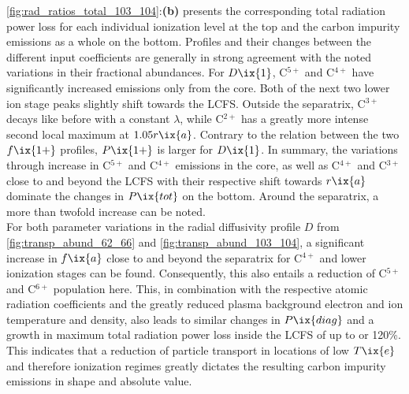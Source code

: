                 \cref{fig:rad_ratios_total_103_104}:\textbf{(b)} presents the corresponding total radiation power loss for each individual ionization level at the top and the carbon impurity emissions as a whole on the bottom. Profiles and their changes between the different input coefficients are generally in strong agreement with the noted variations in their fractional abundances. For $D\ix{1}$, C$^{5+}$ and C$^{4+}$ have significantly increased emissions only from the core. Both of the next two lower ion stage peaks slightly shift towards the LCFS. Outside the separatrix, C$^{3+}$ decays like before with a constant $\lambda$, while C$^{2+}$ has a greatly more intense second local maximum at $1.05r\ix{a}$. Contrary to the relation between the two $f\ix{1+}$ profiles, $P\ix{1+}$ is larger for $D\ix{1}$. In summary, the variations through increase in C$^{5+}$ and C$^{4+}$ emissions in the core, as well as C$^{4+}$ and C$^{3+}$ close to and beyond the LCFS with their respective shift towards $r\ix{a}$ dominate the changes in $P\ix{tot}$ on the bottom. Around the separatrix, a more than twofold increase can be noted.\\%
                For both parameter variations in the radial diffusivity profile $D$ from \cref{fig:transp_abund_62_66} and \ref{fig:transp_abund_103_104}, a significant increase in $f\ix{a}$ close to and beyond the separatrix for C$^{4+}$ and lower ionization stages can be found. Consequently, this also entails a reduction of C$^{5+}$ and C$^{6+}$ population here. This, in combination with the respective atomic radiation coefficients and the greatly reduced plasma background electron and ion temperature and density, also leads to similar changes in $P\ix{diag}$ and a growth in maximum total radiation power loss inside the LCFS of up to or 120\%. This indicates that a reduction of particle transport in locations of low $T\ix{e}$ and therefore ionization regimes greatly dictates the resulting carbon impurity emissions in shape and absolute value.%
%
